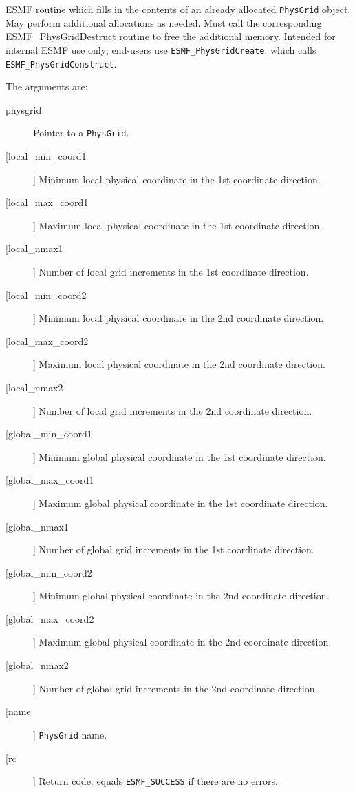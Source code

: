        ESMF routine which fills in the contents of an already
       allocated {\tt PhysGrid} object.  May perform additional allocations
       as needed.  Must call the corresponding ESMF\_PhysGridDestruct
       routine to free the additional memory.  Intended for internal
       ESMF use only; end-users use {\tt ESMF\_PhysGridCreate}, which calls
       {\tt ESMF\_PhysGridConstruct}. 
  
       The arguments are:
       \begin{description}
       \item[physgrid] 
            Pointer to a {\tt PhysGrid}.
       \item[[local\_min\_coord1]]
            Minimum local physical coordinate in the 1st coordinate direction.
       \item[[local\_max\_coord1]]
            Maximum local physical coordinate in the 1st coordinate direction.
       \item[[local\_nmax1]]
            Number of local grid increments in the 1st coordinate direction.
       \item[[local\_min\_coord2]]
            Minimum local physical coordinate in the 2nd coordinate direction.
       \item[[local\_max\_coord2]]
            Maximum local physical coordinate in the 2nd coordinate direction.
       \item[[local\_nmax2]]
            Number of local grid increments in the 2nd coordinate direction.
       \item[[global\_min\_coord1]]
            Minimum global physical coordinate in the 1st coordinate direction.
       \item[[global\_max\_coord1]]
            Maximum global physical coordinate in the 1st coordinate direction.
       \item[[global\_nmax1]]
            Number of global grid increments in the 1st coordinate direction.
       \item[[global\_min\_coord2]]
            Minimum global physical coordinate in the 2nd coordinate direction.
       \item[[global\_max\_coord2]]
            Maximum global physical coordinate in the 2nd coordinate direction.
       \item[[global\_nmax2]]
            Number of global grid increments in the 2nd coordinate direction.
       \item[[name]]
            {\tt PhysGrid} name.
       \item[[rc]] 
            Return code; equals {\tt ESMF\_SUCCESS} if there are no errors.
       \end{description}
  
